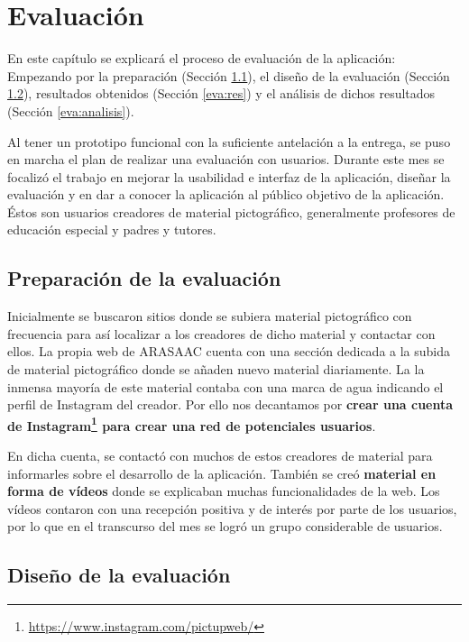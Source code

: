 \chapter{Evaluación}
\label{cap:evaluacion}



\begin{resumen}
	 En este capítulo se explicará el proceso de evaluación de la aplicación: Empezando por la preparación (Sección \ref{eva:prep}), el diseño de la evaluación (Sección \ref{eva:dis}), resultados obtenidos (Sección \ref{eva:res}) y el análisis de dichos resultados (Sección \ref{eva:analisis}).  
	
\end{resumen}

Al tener un prototipo funcional con la suficiente antelación a la entrega, se puso en marcha el plan de realizar una evaluación con usuarios. Durante este mes se focalizó el trabajo en mejorar la usabilidad e interfaz de la aplicación, diseñar la evaluación y en dar a conocer la aplicación al público objetivo de la aplicación. Éstos son usuarios creadores de material pictográfico, generalmente profesores de educación especial y padres y tutores. 


\section{Preparación de la evaluación}
\label{eva:prep}


Inicialmente se buscaron sitios donde se subiera material pictográfico con frecuencia para así localizar a los creadores de dicho material y contactar con ellos. La propia web de ARASAAC cuenta con una sección dedicada a la subida de material pictográfico donde se añaden nuevo material diariamente. La la inmensa mayoría de este material contaba con una marca de agua indicando el perfil de Instagram del creador. Por ello nos decantamos por \textbf{crear una cuenta de Instagram\footnote{\url{https://www.instagram.com/pictupweb/}} para crear una red de potenciales usuarios}. 

En dicha cuenta, se contactó con muchos de estos creadores de material para informarles sobre el desarrollo de la aplicación. También se creó \textbf{material en forma de vídeos} donde se explicaban muchas funcionalidades de la web. Los vídeos contaron con una recepción positiva y de interés por parte de los usuarios, por lo que en el transcurso del mes se logró un grupo considerable de usuarios.
\section{Diseño de la evaluación}
\label{eva:dis}

